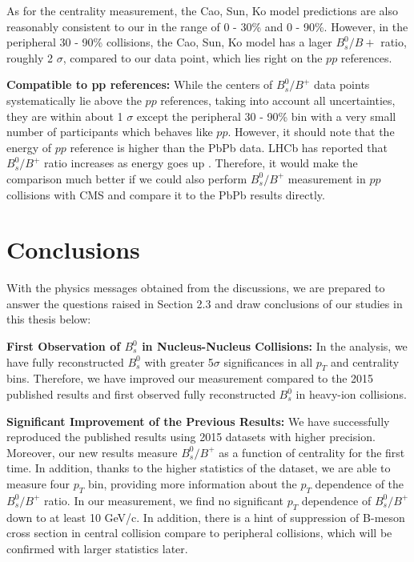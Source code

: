 As for the centrality measurement, the Cao, Sun, Ko model predictions are also reasonably consistent to our in the range of 0 - 30\% and 0 - 90\%. However, in the peripheral 30 - 90\% collisions, the Cao, Sun, Ko model has a lager $B^0_s/B+$ ratio, roughly 2 $\sigma$, compared to our data point, which lies right on the $pp$ references.  


\textbf{Compatible to pp references:} While the centers of $B^0_s/B^+$ data points systematically lie above the $pp$ references, taking into account all uncertainties, they are within about 1 $\sigma$ except the peripheral 30 - 90\% bin with a very small number of participants which behaves like $pp$. However, it should note that the energy of $pp$ reference is higher than the PbPb data. LHCb has reported that $B^0_s/B^+$ ratio increases as energy goes up \cite{LHCbFF}. Therefore, it would make the comparison much better if we could also perform $B^0_s/B^+$ measurement in $pp$ collisions with CMS and compare it to the PbPb results directly.



\section{Conclusions}


With the physics messages obtained from the discussions, we are prepared to answer the questions raised in Section 2.3 and draw conclusions of our studies in this thesis below:



\textbf{First Observation of $B^0_s$ in Nucleus-Nucleus Collisions:} In the analysis, we have fully reconstructed $B^0_s$ with greater 5$\sigma$ significances in all $p_T$ and centrality bins. Therefore, we have improved our measurement compared to the 2015 published results and first observed fully reconstructed $B^0_s$ in heavy-ion collisions.

\textbf{Significant Improvement of the Previous Results:} We have successfully reproduced the published results using 2015 datasets with higher precision. Moreover, our new results measure $B^0_s/B^+$ as a function of centrality for the first time. In addition, thanks to the higher statistics of the dataset, we are able to measure four $p_T$ bin, providing more information about the $p_T$ dependence of the $B^0_s/B^+$ ratio. In our measurement, we find no significant $p_T$ dependence of $B^0_s/B^+$ down to at least 10 GeV/c. In addition, there is a hint of suppression of B-meson cross section in central collision compare to peripheral collisions, which will be confirmed with larger statistics later. 
 
